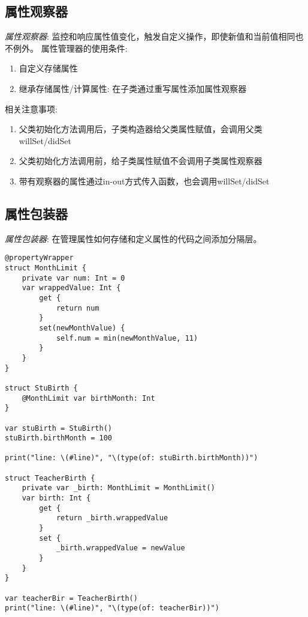 \documentclass{../main.tex}{subfiles}
\begin{document}
\subsection{属性观察器}
\emph{属性观察器}: 监控和响应属性值变化，触发自定义操作，即使新值和当前值相同也不例外。
属性管理器的使用条件:
\begin{enumerate}[itemsep=0pt, parsep=0pt, topsep=0pt, partopsep=0pt]
    \item 自定义存储属性
    \item 继承存储属性/计算属性: 在子类通过重写属性添加属性观察器
\end{enumerate}
相关注意事项:
\begin{enumerate}[itemsep=0pt, parsep=0pt, topsep=0pt, partopsep=0pt]
    \item 父类初始化方法调用后，子类构造器给父类属性赋值，会调用父类willSet/didSet
    \item 父类初始化方法调用前，给子类属性赋值不会调用子类属性观察器
    \item 带有观察器的属性通过in-out方式传入函数，也会调用willSet/didSet
\end{enumerate}

\subsection{属性包装器}
\emph{属性包装器}: 在管理属性如何存储和定义属性的代码之间添加分隔层。

\begin{lstlisting}[style = CodeLstStyleSwift, caption = {属性包装器基本语法}]
@propertyWrapper
struct MonthLimit {
    private var num: Int = 0
    var wrappedValue: Int {
        get {
            return num
        }
        set(newMonthValue) {
            self.num = min(newMonthValue, 11)
        }
    }
}

struct StuBirth {
    @MonthLimit var birthMonth: Int
}

var stuBirth = StuBirth()
stuBirth.birthMonth = 100

print("line: \(#line)", "\(type(of: stuBirth.birthMonth))")

struct TeacherBirth {
    private var _birth: MonthLimit = MonthLimit()
    var birth: Int {
        get {
            return _birth.wrappedValue
        }
        set {
            _birth.wrappedValue = newValue
        }
    }
}

var teacherBir = TeacherBirth()
print("line: \(#line)", "\(type(of: teacherBir))")

\end{lstlisting}
\end{document}
